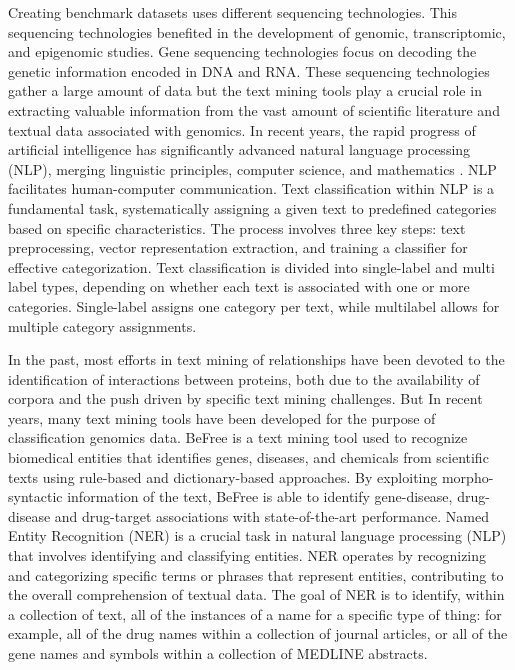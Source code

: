 Creating benchmark datasets uses different sequencing technologies\cite{11}. This sequencing technologies benefited in the development of genomic, transcriptomic, and epigenomic studies. Gene sequencing technologies focus on decoding the genetic information encoded in DNA and RNA. These sequencing technologies gather a large amount of data but the text mining tools play a crucial role in extracting valuable information from the vast amount of scientific literature and textual data associated with genomics. In recent years, the rapid progress of artificial intelligence has significantly advanced natural language processing (NLP), merging linguistic principles, computer science, and mathematics \cite{12}\cite{13}\cite{14}. NLP facilitates human-computer communication. Text classification within NLP is a fundamental task, systematically assigning a given text to predefined categories based on specific characteristics\cite{15}. The process involves three key steps: text preprocessing, vector representation extraction, and training a classifier for effective categorization\cite{16}. Text classification is divided into single-label and multi label types, depending on whether each text is associated with one or more categories\cite{17}\cite{18}\cite{19}. Single-label assigns one category per text, while multilabel allows for multiple category assignments.

In the past, most efforts in text mining of relationships have been devoted to the identification of interactions between proteins, both due to the availability of corpora and the push driven by specific text mining challenges\cite{20}. But In recent years, many text mining tools have been developed for the purpose of classification genomics data. BeFree is a text mining tool used to recognize  biomedical entities that identifies genes, diseases, and chemicals from scientific texts using rule-based and dictionary-based approaches. By exploiting morpho-syntactic information of the text, BeFree is able to identify gene-disease, drug-disease and drug-target associations with state-of-the-art performance. Named Entity Recognition (NER) is a crucial task in natural language processing (NLP) that involves identifying and classifying entities. NER operates by recognizing and categorizing specific terms or phrases that represent entities, contributing to the overall comprehension of textual data. The goal of NER is to identify, within a collection of text, all of the instances of a name for a specific type of thing: for example, all of the drug names within a collection of journal articles, or all of the gene names and symbols within a collection of MEDLINE abstracts.\cite{21}

